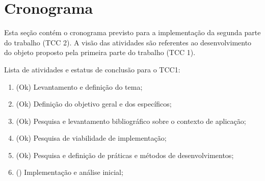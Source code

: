 \section{Cronograma}
\label{sec:cron}

Esta seção contém o cronograma previsto para a implementação da segunda
parte do trabalho (TCC 2). A visão das atividades são referentes ao
desenvolvimento do objeto proposto pela primeira parte do trabalho (TCC 1).

Lista de atividades e estatus de conclusão para o TCC1:
\begin{enumerate}
  \item (Ok) Levantamento e definição do tema;
  \item (Ok) Definição do objetivo geral e dos específicos;
  \item (Ok) Pesquisa e levantamento bibliográfico sobre o contexto de aplicação;
  \item (Ok) Pesquisa de viabilidade de implementação;
  \item (Ok) Pesquisa e definição de práticas e métodos de desenvolvimentos;
  \item (\hspace{17pt}) Implementação e análise inicial;
\end{enumerate}

